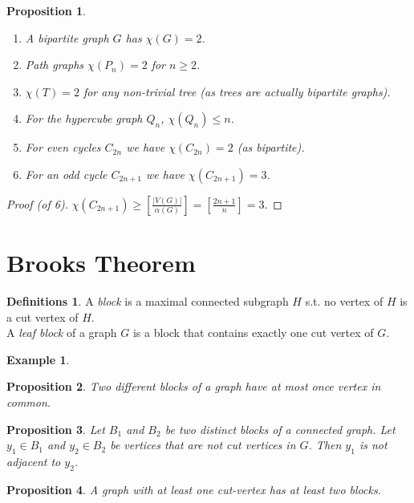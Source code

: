 \documentclass{article}
\newtheorem*{prop}{Proposition}
\theoremstyle{definition}
\newtheorem*{defns}{Definitions}
\newtheorem*{ex}{Example}
\begin{document}
\begin{prop}
\begin{enumerate}
\item A bipartite graph $G$ has $\chi(G) = 2$.
\item Path graphs $\chi(P_n) = 2$ for $n \ge 2$.
\item $\chi(T) = 2$ for any non-trivial tree (as trees are actually bipartite graphs).
\item For the hypercube graph $Q_n$, $\chi(Q_n) \le n$.
\item For even cycles $C_{2n}$ we have $\chi(C_{2n}) = 2$ (as bipartite).
\item For an odd cycle $C_{2n+1}$ we have $\chi(C_{2n+1}) = 3$.
\end{enumerate}
\end{prop}

\begin{proof}[Proof (of 6)]
$\chi(C_{2n+1}) \ge \left[ \frac{|V(G)|}{\alpha(G)}\right] = \left[\frac{2n+1}{n} \right] = 3$.
\end{proof}


\section{Brooks Theorem}

\begin{defns}
A \emph{block} is a maximal connected subgraph $H$ s.t. no vertex of $H$ is a cut vertex of $H$. \\
A \emph{leaf block} of a graph $G$ is a block that contains exactly one cut vertex of $G$.
\end{defns}

\begin{ex}
\end{ex}

\begin{prop}
Two different blocks of a graph have at most once vertex in common.
\end{prop}

\begin{prop}
Let $B_1$ and $B_2$ be two distinct blocks of a connected graph.
Let $y_1\in B_1$ and $y_2\in B_2$ be vertices that are not cut vertices in $G$.
Then $y_1$ is not adjacent to $y_2$.
\end{prop}

\begin{prop}
A graph with at least one cut-vertex has at least two blocks.
\end{prop}
\end{document}
